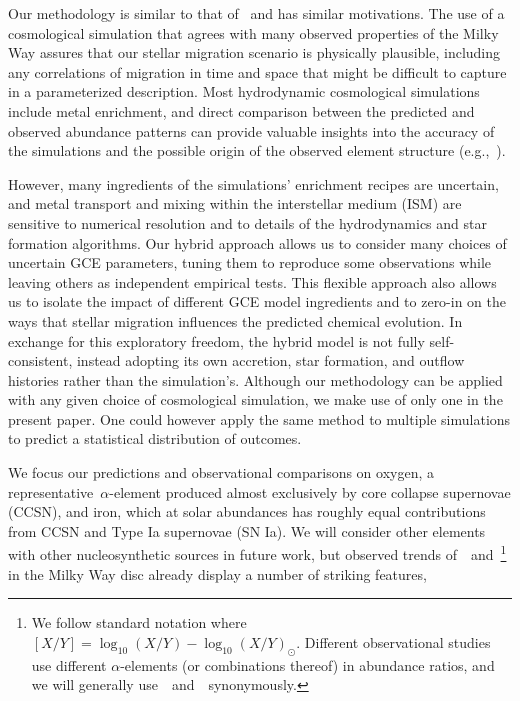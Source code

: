 \documentclass[draft2.tex]{subfiles}
\begin{document}
Our methodology is similar to that of~\citet*{Minchev2013, Minchev2014} and has 
similar motivations. 
The use of a cosmological simulation that agrees with many observed properties 
of the Milky Way assures that our stellar migration scenario is physically 
plausible, including any correlations of migration in time and space that might 
be difficult to capture in a parameterized description. 
Most hydrodynamic cosmological simulations include metal enrichment, and direct 
comparison between the predicted and observed abundance patterns can provide 
valuable insights into the accuracy of the simulations and the possible origin 
of the observed element structure (e.g.,~\citealt{Mackereth2018, Grand2018, 
Buck2020b, Vincenzo2020, Buck2021}). 
\par 
However, many ingredients of the simulations' enrichment recipes are 
uncertain, and metal transport and mixing within the interstellar medium (ISM) 
are sensitive to numerical resolution and to details of the hydrodynamics and 
star formation algorithms. 
Our hybrid approach allows us to consider many 
choices of uncertain GCE parameters, tuning them to reproduce some 
observations while leaving others as independent empirical tests. 
This flexible approach also allows us to isolate the impact of different 
GCE model ingredients and to zero-in on the ways that stellar migration 
influences the predicted chemical evolution. 
In exchange for this exploratory freedom, the hybrid model is not fully 
self-consistent, instead adopting its own accretion, star formation, and 
outflow histories rather than the simulation's. Although our methodology can 
be applied with any given choice of cosmological simulation, we make use of 
only one in the present paper. 
One could however apply the same method to multiple simulations to 
predict a statistical distribution of outcomes. 
\par 
We focus our predictions and observational comparisons on oxygen, a 
representative~$\alpha$-element produced almost exclusively by core 
collapse supernovae (CCSN), and iron, which at solar abundances has roughly 
equal contributions from CCSN and Type Ia supernovae (SN Ia). We will consider 
other elements with other nucleosynthetic sources in future work, but 
observed trends of~\feh~and~\afe\footnote{
	We follow standard notation where $[X/Y] = \log_{10}(X/Y) - 
	\log_{10}(X/Y)_\odot$. Different observational studies use different 
	$\alpha$-elements (or combinations thereof) in abundance ratios, and we 
	will generally use~\ofe~and~\afe~synonymously. 
} in the Milky Way disc already display a number of striking features, 
\end{document}
